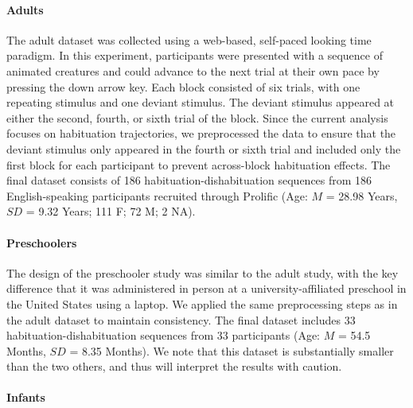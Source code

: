 \documentclass[10pt, letterpaper]{article}
\begin{document}
\hypertarget{adults}{%
\paragraph{Adults}\label{adults}}

The adult dataset was collected using a web-based, self-paced looking
time paradigm. In this experiment, participants were presented with a
sequence of animated creatures and could advance to the next trial at
their own pace by pressing the down arrow key. Each block consisted of
six trials, with one repeating stimulus and one deviant stimulus. The
deviant stimulus appeared at either the second, fourth, or sixth trial
of the block. Since the current analysis focuses on habituation
trajectories, we preprocessed the data to ensure that the deviant
stimulus only appeared in the fourth or sixth trial and included only
the first block for each participant to prevent across-block habituation
effects. The final dataset consists of 186 habituation-dishabituation
sequences from 186 English-speaking participants recruited through
Prolific (Age: \(M\) = 28.98 Years, \(SD\) = 9.32 Years; 111 F; 72 M; 2
NA).

\hypertarget{preschoolers}{%
\paragraph{Preschoolers}\label{preschoolers}}

The design of the preschooler study was similar to the adult study, with
the key difference that it was administered in person at a
university-affiliated preschool in the United States using a laptop. We
applied the same preprocessing steps as in the adult dataset to maintain
consistency. The final dataset includes 33 habituation-dishabituation
sequences from 33 participants (Age: \(M\) = 54.5 Months, \(SD\) = 8.35
Months). We note that this dataset is substantially smaller than the two
others, and thus will interpret the results with caution.

\hypertarget{infants}{%
\paragraph{Infants}\label{infants}}
\end{document}
